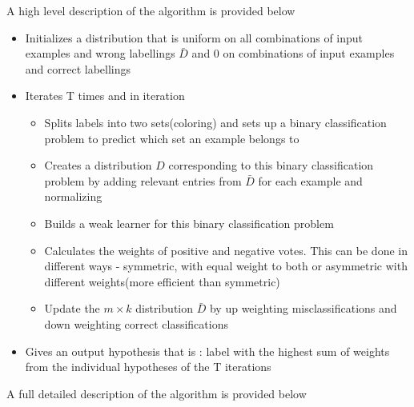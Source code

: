 \documentclass[11pt]{article}
\begin{document}
A high level description of the algorithm is provided below
\begin{itemize}
\item Initializes a distribution that is uniform on all combinations of input examples and wrong labellings $\bar D$ and 0 on combinations of input examples and correct labellings
\item Iterates T times and in iteration
\begin{itemize}
\item Splits labels into two sets(coloring) and sets up a binary classification problem to predict which set an example belongs to
\item Creates a distribution $D$ corresponding to this binary classification problem by adding relevant entries from $\bar D$ for each example and normalizing
\item Builds a weak learner for this binary classification problem
\item Calculates the weights of positive and negative votes. This can be done in different ways - symmetric, with equal weight to both or asymmetric with different weights(more efficient than symmetric)
\item Update the $m \times k$ distribution $\bar D$ by up weighting misclassifications and down weighting correct classifications
\end{itemize}
\item Gives an output hypothesis that is : label with the highest sum of weights from the individual hypotheses of the T iterations
\end{itemize}

A full detailed description of the algorithm is provided below
\end{document}

